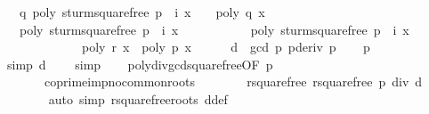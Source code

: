 \begin{isabellebody}
\ \ \ q{\isacharunderscore}{}{\isacharcolon}\ {\isachardoublequoteopen}poly\ {\isacharparenleft}sturm{\isacharunderscore}squarefree{\isacharprime}\ p\ {\isacharbang}\ {\isacharparenleft}i{\isacharplus}{}{\isacharparenright}{\isacharparenright}\ x\ {\isacharequal}\ {}{\isachardoublequoteclose}\ {\isacharparenleft}\ {\isachardoublequoteopen}poly\ {\isacharquery}q\ x\ {\isacharequal}\ {}{\isachardoublequoteclose}{\isacharparenright}\isanewline
\ \ \ {\isachardoublequoteopen}poly\ {\isacharparenleft}sturm{\isacharunderscore}squarefree{\isacharprime}\ p\ {\isacharbang}\ {\isacharparenleft}i{\isacharplus}{}{\isacharparenright}{\isacharparenright}\ x\ {\isacharasterisk}\ \isanewline
\ \ \ \ \ \ \ \ \ poly\ {\isacharparenleft}sturm{\isacharunderscore}squarefree{\isacharprime}\ p\ {\isacharbang}\ i{\isacharparenright}\ x\ {\isacharless}\ {}{\isachardoublequoteclose}\isanewline
\ \ \ \ \ \ \ \ \ \ \ \ {\isacharparenleft}\ {\isachardoublequoteopen}poly\ {\isacharquery}r\ x\ {\isacharasterisk}\ poly\ {\isacharquery}p\ x\ {\isacharless}\ {}{\isachardoublequoteclose}{\isacharparenright}\isanewline
%
\isadelimproof
%
\endisadelimproof
%
\isatagproof
{}\isamarkupfalse%
{\isacharminus}\isanewline
\ \ \isamarkupfalse%
\ d\ {\isasymequiv}\ {\isachardoublequoteopen}gcd\ p\ {\isacharparenleft}pderiv\ p{\isacharparenright}{\isachardoublequoteclose}\isanewline
\ \ \isamarkupfalse%
\ {\isacharbackquoteopen}p\ {\isasymnoteq}\ {}{\isacharbackquoteclose}\ \isamarkupfalse%
\ {\isacharbrackleft}simp{\isacharbrackright}{\isacharcolon}\ {\isachardoublequoteopen}d\ {\isasymnoteq}\ {}{\isachardoublequoteclose}\ \isamarkupfalse%
\ simp\isanewline
\ \ \isamarkupfalse%
\ poly{\isacharunderscore}div{\isacharunderscore}gcd{\isacharunderscore}squarefree{\isacharparenleft}{}{\isacharparenright}{\isacharbrackleft}OF\ {\isacharbackquoteopen}p\ {\isasymnoteq}\ {}{\isacharbackquoteclose}{\isacharbrackright}\isanewline
\ \ \ \ \ \ \ coprime{\isacharunderscore}imp{\isacharunderscore}no{\isacharunderscore}common{\isacharunderscore}roots\isanewline
\ \ \ \ \ \ \isamarkupfalse%
\ rsquarefree{\isacharcolon}\ {\isachardoublequoteopen}rsquarefree\ {\isacharparenleft}p\ div\ d{\isacharparenright}{\isachardoublequoteclose}\ \isanewline
\ \ \ \ \ \ \isamarkupfalse%
\ {\isacharparenleft}auto\ simp{\isacharcolon}\ rsquarefree{\isacharunderscore}roots\ d{\isacharunderscore}def{\isacharparenright}\isanewline

\end{isabellebody}
